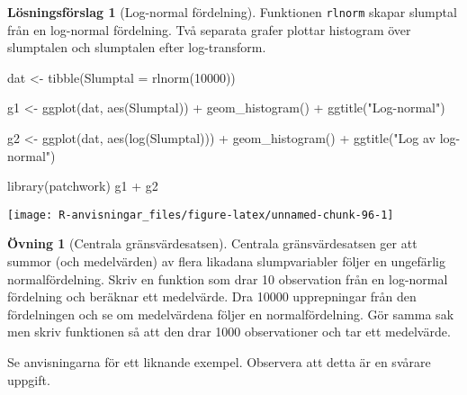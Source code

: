 \documentclass[
]{book}
\newenvironment{Shaded}{\begin{snugshade}}{\end{snugshade}}
\newcommand{\AttributeTok}[1]{\textcolor[rgb]{0.77,0.63,0.00}{#1}}
\newcommand{\DecValTok}[1]{\textcolor[rgb]{0.00,0.00,0.81}{#1}}
\newcommand{\FunctionTok}[1]{\textcolor[rgb]{0.00,0.00,0.00}{#1}}
\newcommand{\NormalTok}[1]{#1}
\newcommand{\OtherTok}[1]{\textcolor[rgb]{0.56,0.35,0.01}{#1}}
\newcommand{\SpecialCharTok}[1]{\textcolor[rgb]{0.00,0.00,0.00}{#1}}
\newcommand{\StringTok}[1]{\textcolor[rgb]{0.31,0.60,0.02}{#1}}
\theoremstyle{definition}
\theoremstyle{definition}
\theoremstyle{definition}
\newtheorem{exercise}{Övning}[chapter]
\theoremstyle{definition}
\newtheorem{hypothesis}{Lösningsförslag}[chapter]
\theoremstyle{remark}
\begin{document}
\begin{hypothesis}[Log-normal fördelning]

Funktionen \texttt{rlnorm} skapar slumptal från en log-normal fördelning. Två separata grafer plottar histogram över slumptalen och slumptalen efter log-transform.

\begin{Shaded}
\begin{Highlighting}[]
\NormalTok{dat }\OtherTok{\textless{}{-}} \FunctionTok{tibble}\NormalTok{(}\AttributeTok{Slumptal =} \FunctionTok{rlnorm}\NormalTok{(}\DecValTok{10000}\NormalTok{))}

\NormalTok{g1 }\OtherTok{\textless{}{-}} \FunctionTok{ggplot}\NormalTok{(dat, }\FunctionTok{aes}\NormalTok{(Slumptal)) }\SpecialCharTok{+} 
  \FunctionTok{geom\_histogram}\NormalTok{() }\SpecialCharTok{+}
  \FunctionTok{ggtitle}\NormalTok{(}\StringTok{"Log{-}normal"}\NormalTok{)}
  
\NormalTok{g2 }\OtherTok{\textless{}{-}} \FunctionTok{ggplot}\NormalTok{(dat, }\FunctionTok{aes}\NormalTok{(}\FunctionTok{log}\NormalTok{(Slumptal))) }\SpecialCharTok{+} 
  \FunctionTok{geom\_histogram}\NormalTok{() }\SpecialCharTok{+}
  \FunctionTok{ggtitle}\NormalTok{(}\StringTok{"Log av log{-}normal"}\NormalTok{)}

\FunctionTok{library}\NormalTok{(patchwork)}
\NormalTok{g1 }\SpecialCharTok{+}\NormalTok{ g2}
\end{Highlighting}
\end{Shaded}

\begin{center}\texttt{[image: R-anvisningar\_files/figure-latex/unnamed-chunk-96-1]} \end{center}

\end{hypothesis}

\begin{exercise}[Centrala gränsvärdesatsen]
Centrala gränsvärdesatsen ger att summor (och medelvärden) av flera likadana slumpvariabler följer en ungefärlig normalfördelning. Skriv en funktion som drar 10 observation från en log-normal fördelning och beräknar ett medelvärde. Dra 10000 upprepningar från den fördelningen och se om medelvärdena följer en normalfördelning. Gör samma sak men skriv funktionen så att den drar 1000 observationer och tar ett medelvärde.

Se anvisningarna för ett liknande exempel. Observera att detta är en svårare uppgift.
\end{exercise}
\end{document}
